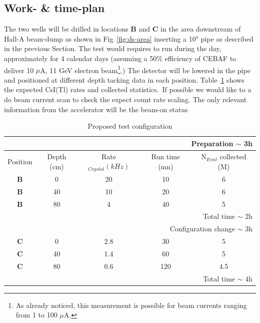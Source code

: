 \subsection{Work- \& time-plan}
The two wells  will be drilled in locations {\bf B} and {\bf C} in the area downstream of Hall-A beam-dump as shown in Fig~\ref{fig:ds-area} inserting a 10" pipe as described in the previous Section. The test would requires to run during the day, approximately for 4 calendar  days (assuming a 50$\%$ efficiency of CEBAF to deliver 10 $\mu$A,  11 GeV electron beam\footnote{As already noticed, this measurement is possible for beam currents ranging from 1 to 100  $\mu$A.}.)
The detector will be lowered in the pipe and positioned at different depth tacking  data in each position. Table~\ref{tab:test} shows the expected CsI(Tl) rates and collected statistics.\
If possible  we would like to a do beam current scan to check the expect count rate scaling.
The only relevant information from the accelerator will be the beam-on status 
\begin{table}[htp]
\caption{Proposed test configuration}
\begin{center}
\begin{tabular}{|c|c|c|c|c|}
\hline\hline
\multicolumn{5}{r}{Preparation  $\sim$ 3h } \\
\hline
Position  &Depth  (cm)& Rate$_{Crystal} (kHz)$  &Run time (mn) & N$_{Evnt}$ collected (M)  \\
\hline\hline
 {\bf B} & 0 &  20 & 10 & 6\\
 \hline
 {\bf B}  & 40 &  10 & 20 & 6 \\
 \hline
 {\bf B}  & 80 &  4 & 40 & 5\\
 \hline
\multicolumn{5}{|r|}{Total time    $\sim$ 2h }\\
 \hline\hline
\multicolumn{5}{r}{Configuration change  $\sim$ 3h } \\
 \hline\hline
 {\bf C} & 0 &  2.8 & 30 & 5\\
 \hline
 {\bf C}  & 40 &  1.4 & 60 & 5 \\
 \hline
 {\bf C}  & 80 &  0.6 & 120 &4.5\\
 \hline
\multicolumn{5}{|r|}{Total time    $\sim$ 4h }\\
 \hline\hline
\end{tabular}
\end{center}
\label{tab:test}
\end{table}

